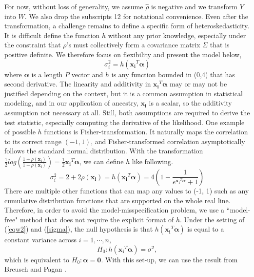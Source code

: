 \documentclass[12pt]{extarticle}
\theoremstyle{theorem}
\begin{document}
\noindent
For now, without loss of generality, we assume $\hat{\rho}$ is negative and we transform $Y$ into $W$. We also drop the subscripts 12 for notational convenience. Even after the transformation, a challenge remains to define a specific form of heteroskedasticity. It is difficult define the function $h$ without any prior knowledge, especially under the constraint that $\rho$'s must collectively form a covariance matrix $\Sigma$ that is positive definite. We therefore focus on flexibility and present the model below,
\begin{equation}
    \sigma_{i}^2 = h(\bm{x_i}^T\bm{\alpha})
    \label{sigma}
\end{equation}
where $\bm{\alpha}$ is a length $P$ vector and $h$ is any function bounded in (0,4) that has second derivative. The linearity and additivity in $\bm{x_i}^T \bm{\alpha}$ may or may not be justified depending on the context, but it is a common assumption in statistical modeling, and in our application of ancestry, $\bm{x_i}$ is a scalar, so the additivity assumption not necessary at all. Still, both assumptions are required to derive the test statistic, especially computing the derivative of the likelihood. One example of possible $h$ functions is Fisher-transformation. It naturally maps the correlation to its correct range $(-1,1)$, and Fisher-transformed correlation asymptotically follows the standard normal distribution. With the transformation $\frac{1}{2} log \left(
\frac{1 + \rho(\bm{x_i})}{1-\rho(\bm{x_i})}
\right) = \frac{1}{2} \bm{x_i}^T \bm{\alpha}$, we can define $h$ like following.
\begin{equation}
\sigma_{i}^2 = 2 + 2\rho(\bm{x_i}) = h(\bm{x_i}^T \bm{\alpha}) = 4 \left( 1 - \frac{1}{e^{\bm{x_i}^T \bm{\alpha}}+1} \right)
\label{fisher}
\end{equation}
\noindent There are multiple other functions that can map any values to (-1, 1) such as any cumulative distribution functions that are supported on the whole real line. Therefore, in order to avoid the model-misspecification problem, we use a ``model-free" method that does not require the explicit format of $h$. Under the setting of (\ref{eqw2}) and (\ref{sigma}), the null hypothesis is that $h(\bm{x_i}^T \bm{\alpha})$ is equal to a constant variance  across $i = 1, \cdots, n$,
\begin{equation}
H_0: h(\bm{x_i}^T\bm{\alpha}) = \sigma^2,
\label{null1}
\end{equation}
which is equivalent to $H_0: \bm{\alpha} = \bm{0}$. With this set-up, we can use the result from Breusch and Pagan \cite{breusch1979simple}. \\
\end{document}

